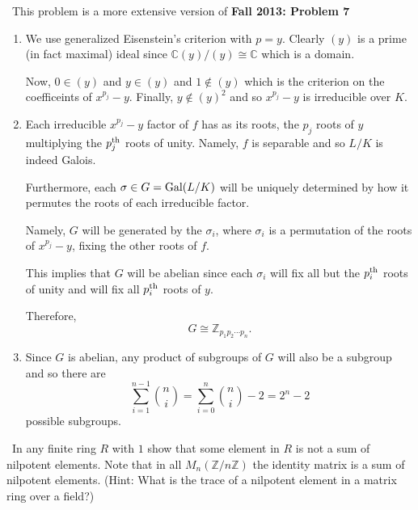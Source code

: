 \documentclass[12pt]{Qual}
\begin{document}
\begin{solution}$\,$
This problem is a more extensive version of \textbf{Fall 2013: Problem 7}
\begin{enumerate}[label=(\alph*)]
    \item We use generalized Eisenstein's criterion with $p=y$. Clearly $(y)$ is a prime (in fact maximal) ideal since $\mathbb{C}(y)/(y)\cong\mathbb{C}$ which is a domain.

    Now, $0\in(y)$ and $y\in (y)$ and $1\notin (y)$ which is the criterion on the coefficeints of $x^{p_j}-y$. Finally, $y\notin(y)^2$ and so $x^{p_j}-y$ is irreducible over $K$.

    \item Each irreducible $x^{p_j}-y$ factor of $f$ has as its roots, the $p_j$ roots of $y$ multiplying the $p_j^\text{th}$ roots of unity. Namely, $f$ is separable and so $L/K$ is indeed Galois.

    Furthermore, each $\sigma\in G=\text{Gal}(L/K)$ will be uniquely determined by how it permutes the roots of each irreducible factor.

    Namely, $G$ will be generated by the $\sigma_i$, where $\sigma_i$ is a permutation of the roots of $x^{p_j}-y$, fixing the other roots of $f.$

    This implies that $G$ will be abelian since each $\sigma_i$ will fix all but the $p_i^\text{th}$ roots of unity and will fix all $p_i^\text{th}$ roots of $y.$

    Therefore, $$G\cong\mathbb{Z}_{p_1p_2\cdots p_n}.$$

    \item Since $G$ is abelian, any product of subgroups of $G$ will also be a subgroup and so there are $$\sum_{i=1}^{n-1}\binom{n}{i}=\sum_{i=0}^n\binom{n}{i}-2=2^n-2$$ possible subgroups.
\end{enumerate}
\end{solution}
\newpage



\begin{problem} $\,$
In any finite ring $R$ with $1$ show that some element in $R$ is not a sum of nilpotent elements. Note that in all $M_n(\mathbb{Z}/n\mathbb{Z})$ the identity matrix is a sum of nilpotent elements. (Hint: What is the trace of a nilpotent element in a matrix ring over a field?)
\end{problem}
\end{document}
